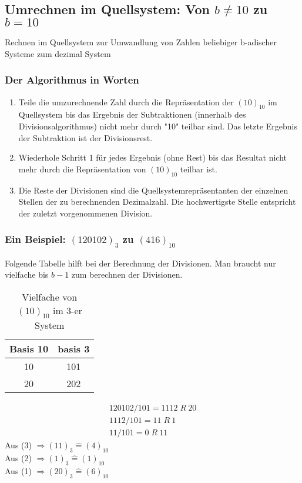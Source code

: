 \documentclass[a4paper]{article}
\newcommand{\entspricht}{\mathrel{\widehat{=}}}
\begin{document}
\subsection{\texorpdfstring{Umrechnen im Quellsystem: Von $b \neq 10$ zu $b = 10$}{Rechnen im Quellsystem: Von b-adisch ungleich 10 zu Basis 10}}
Rechnen im Quellsystem zur Umwandlung von Zahlen beliebiger b-adischer Systeme zum dezimal System

\subsubsection{Der Algorithmus in Worten}
\begin{enumerate}
\item Teile die umzurechnende Zahl durch die Repräsentation der $(10)_{10}$ im Quellsystem bis das Ergebnis der Subtraktionen (innerhalb des Divisionsalgorithmus) nicht mehr durch "10" teilbar sind. Das letzte Ergebnis der Subtraktion ist der Divisionsrest.
\item Wiederhole Schritt 1 für jedes Ergebnis (ohne Rest) bis das Resultat nicht mehr durch die Repräsentation von $(10)_{10}$ teilbar ist.
\item Die Reste der Divisionen sind die Quellsystemrepräsentanten der einzelnen Stellen der zu berechnenden Dezimalzahl. Die hochwertigste Stelle entspricht der zuletzt vorgenommenen Division.
\end{enumerate}

\subsubsection{\texorpdfstring{Ein Beispiel: $(120102)_3$ zu $(416)_{10}$}{Ein Beispiel: 120102 Basis 3 zu Dezimal 416}}
Folgende Tabelle hilft bei der Berechnung der Divisionen. Man braucht nur vielfache bis $b-1$ zum berechnen der Divisionen.
\begin{table}[H]
\centering
\caption{Vielfache von $(10)_{10}$ im 3-er System}
\label{vielfacheVon10in3}
\begin{tabular}{c|c}
Basis 10 & basis 3 \\\hline
10       & 101     \\\hline
20       & 202
\end{tabular}
\end{table}
\begin{eqnarray}
120102 / 101 =  1112\;R\:20 \\
1112 / 101 = 11\;R\:1 \\
11 / 101 = 0\;R\:11
\end{eqnarray}
Aus (3) $ \Rightarrow  (11)_3 \entspricht (4)_{10} $ \\
Aus (2) $ \Rightarrow  (1)_3 \entspricht (1)_{10} $ \\
Aus (1) $ \Rightarrow  (20)_3 \entspricht (6)_{10} $ \\
\end{document}
